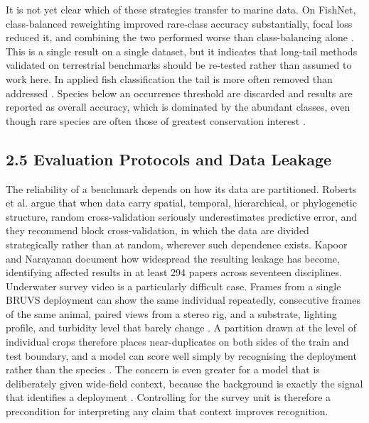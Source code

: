\documentclass[preprint,12pt]{elsarticle}
\begin{document}
It is not yet clear which of these strategies transfer to marine data.
On FishNet, class-balanced reweighting improved rare-class accuracy
substantially, focal loss reduced it, and combining the two performed
worse than class-balancing alone \cite{ref10}.
This is a single result on a single dataset, but it indicates that
long-tail methods validated on terrestrial benchmarks should be
re-tested rather than assumed to work here. In applied fish
classification the tail is more often removed than addressed
\cite{ref6} \cite{ref8}.
Species below an occurrence threshold are discarded and results are
reported as overall accuracy, which is dominated by the abundant
classes, even though rare species are often those of greatest
conservation interest \cite{ref66}.

\subsection*{2.5 Evaluation Protocols and Data
Leakage}\label{evaluation-protocols-and-data-leakage}

The reliability of a benchmark depends on how its data are partitioned.
Roberts et al. \cite{ref17} argue that when data
carry spatial, temporal, hierarchical, or phylogenetic structure, random
cross-validation seriously underestimates predictive error, and they
recommend block cross-validation, in which the data are divided
strategically rather than at random, wherever such dependence exists.
Kapoor and Narayanan \cite{ref20} document how
widespread the resulting leakage has become, identifying affected
results in at least 294 papers across seventeen disciplines. Underwater
survey video is a particularly difficult case. Frames from a single
BRUVS deployment can show the same individual repeatedly, consecutive
frames of the same animal, paired views from a stereo rig, and a
substrate, lighting profile, and turbidity level that barely change
\cite{ref4}
\cite{ref19}. A partition drawn at the level of
individual crops therefore places near-duplicates on both sides of the
train and test boundary, and a model can score well simply by
recognising the deployment rather than the species
\cite{ref18}
\cite{ref58}. The concern is even greater for a
model that is deliberately given wide-field context, because the
background is exactly the signal that identifies a deployment
\cite{ref18}
\cite{ref58}. Controlling for the survey unit is
therefore a precondition for interpreting any claim that context
improves recognition.
\end{document}
